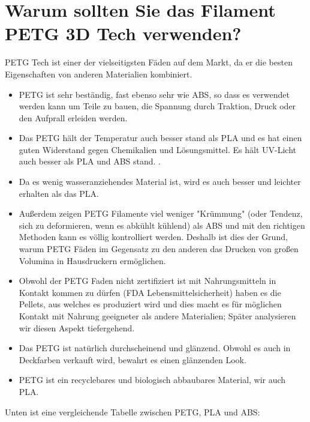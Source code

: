 \documentclass[11pt,a4paper]{article}
\begin{document}
\section{Warum sollten Sie das Filament PETG 3D Tech verwenden?}
PETG Tech ist einer der vielseitigsten Fäden auf dem Markt, da er die besten Eigenschaften von anderen Materialien kombiniert.
\begin{itemize}
\item PETG ist sehr beständig, fast ebenso sehr wie ABS, so dass es verwendet werden kann um Teile zu bauen, die Spannung durch Traktion, Druck oder den Aufprall erleiden werden.
\item Das PETG hält der Temperatur auch besser stand als PLA und es hat einen guten Widerstand gegen Chemikalien und Lösungsmittel. Es hält UV-Licht auch besser als PLA und ABS stand. .
\item Da es wenig wasseranziehendes Material ist, wird es auch besser und leichter erhalten als das PLA. 
\item Außerdem zeigen PETG Filamente viel weniger "Krümmung" (oder Tendenz, sich zu deformieren, wenn es abkühlt kühlend) als ABS und mit den richtigen Methoden kann es völlig kontrolliert werden. Deshalb ist dies der Grund, warum PETG Fäden im Gegensatz zu den anderen das Drucken von großen Volumina in Hausdruckern ermöglichen.
\item Obwohl der PETG Faden nicht zertifiziert ist mit Nahrungsmitteln in Kontakt kommen zu dürfen (FDA Lebensmittelsicherheit) haben es die Pellets, aus welches es produziert wird und dies macht es für möglichen Kontakt mit Nahrung geeigneter als andere Materialien; Später analysieren wir diesen Aspekt tiefergehend.
\item Das PETG ist natürlich durchscheinend und glänzend. Obwohl es auch in Deckfarben verkauft wird, bewahrt es einen glänzenden Look.
\item PETG ist ein recyclebares und biologisch abbaubares Material, wir auch PLA. 

\end{itemize}
Unten ist eine vergleichende Tabelle zwischen PETG, PLA und ABS:  
\end{document}
